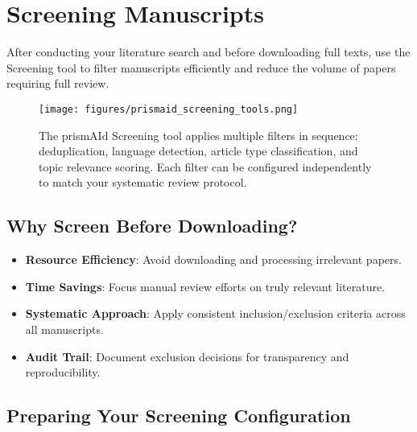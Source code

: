 \section{Screening Manuscripts}

After conducting your literature search and before downloading full texts, use the Screening tool to filter manuscripts efficiently and reduce the volume of papers requiring full review.

\begin{figure}[h]
    \centering
    \texttt{[image: figures/prismaid\_screening\_tools.png]}
    \caption{The prismAId Screening tool applies multiple filters in sequence: deduplication, language detection, article type classification, and topic relevance scoring. Each filter can be configured independently to match your systematic review protocol.}
    \label{fig:screening_tools}
\end{figure}

\subsection{Why Screen Before Downloading?}

\begin{itemize}
    \item \textbf{Resource Efficiency}: Avoid downloading and processing irrelevant papers.
    \item \textbf{Time Savings}: Focus manual review efforts on truly relevant literature.
    \item \textbf{Systematic Approach}: Apply consistent inclusion/exclusion criteria across all manuscripts.
    \item \textbf{Audit Trail}: Document exclusion decisions for transparency and reproducibility.
\end{itemize}

\subsection{Preparing Your Screening Configuration}

